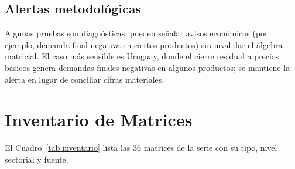 \documentclass[11pt,a4paper]{article}
\begin{document}
\subsection{Alertas metodológicas}
Algunas pruebas son diagnósticas: pueden señalar avisos económicos (por ejemplo,
demanda final negativa en ciertos productos) sin invalidar el álgebra matricial.
El caso más sensible es Uruguay, donde el cierre residual a precios básicos genera
demandas finales negativas en algunos productos; se mantiene la alerta en lugar de
conciliar cifras materiales.

\section{Inventario de Matrices}

El Cuadro~\ref{tab:inventario} lista las 36 matrices de la serie con su tipo,
nivel sectorial y fuente.
\end{document}
